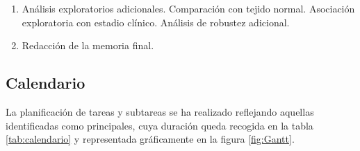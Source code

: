 \documentclass[11pt]{article}
\begin{document}
\begin{enumerate}
			\item Análisis exploratorios adicionales.
				\subitem Comparación con tejido normal.
				\subitem Asociación exploratoria con estadio clínico.
				\subitem Análisis de robustez adicional.
				
			\item Redacción de la memoria final.
		\end{enumerate}
		
		\subsection{Calendario}
			
La planificación de tareas y subtareas se ha realizado reflejando aquellas identificadas como principales, cuya duración queda recogida en la tabla \ref{tab:calendario} y representada gráficamente en la figura \ref{fig:Gantt}.
			
\end{document}
